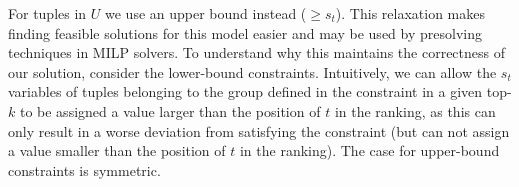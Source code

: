 For tuples in $U$ we use an upper bound instead ($\geq s_t$). This relaxation makes finding feasible solutions for this model easier and may be used by presolving techniques in MILP solvers.
% 
To understand why this maintains the correctness of our solution, consider the lower-bound constraints. Intuitively, we can allow the $s_t$ variables of tuples belonging to the group defined in the constraint in a given top-$k$ to be assigned a value larger than the position of $t$ in the ranking, as this can only result in a worse deviation from satisfying the constraint (but can not assign a value smaller than the position of $t$ in the ranking). The case for upper-bound constraints is symmetric.





